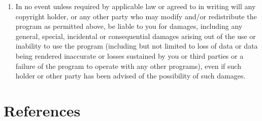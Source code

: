 \begin{enumerate}
\item
{\sc In no event unless required by applicable law or agreed to in writing
will any copyright holder, or any other party who may modify and/or
redistribute the program as permitted above, be liable to you for damages,
including any general, special, incidental or consequential damages arising
out of the use or inability to use the program (including but not limited
to loss of data or data being rendered inaccurate or losses sustained by
you or third parties or a failure of the program to operate with any other
programs), even if such holder or other party has been advised of the
possibility of such damages.}

\end{enumerate}

\newpage
\section{References}




